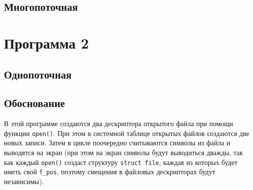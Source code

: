 


\subsection{Многопоточная}

\begin{center}
    \captionsetup{justification=raggedright,singlelinecheck=off}
    
\end{center}





\section{Программа 2}

\subsection{Однопоточная}

\begin{center}
    \captionsetup{justification=raggedright,singlelinecheck=off}
    
\end{center}


\subsection{Обоснование}

В этой программе создаются два дескриптора открытого файла при помощи функции \texttt{open()}. При этом в системной таблице открытых файлов создаются две новых записи. Затем в цикле поочередно считываются символы из файла и выводятся на экран (при этом на экран символы будут выводиться дважды, так как каждый \texttt{open()} создаст структуру \texttt{struct file}, каждая из которых будет иметь свой \texttt{f\_pos}, поэтому смещения в файловых дескрипторах будут независимы).




